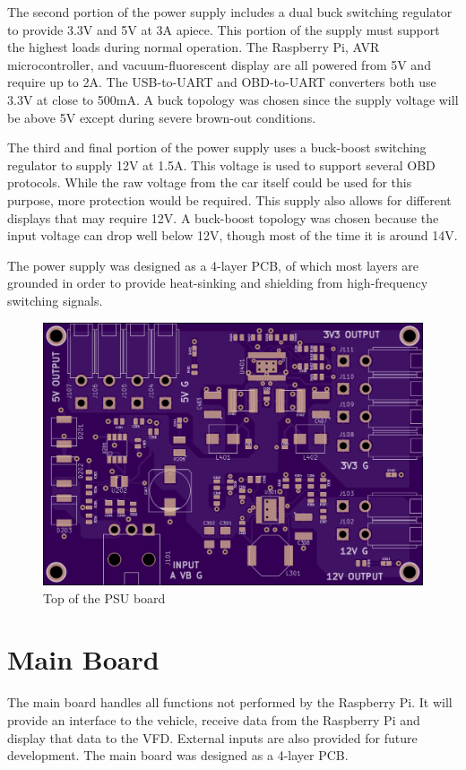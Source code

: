 The second portion of the power supply includes a dual buck switching regulator
to provide 3.3V and 5V at 3A apiece.  This portion of the supply must support 
the highest loads during normal operation.  The Raspberry Pi, AVR 
microcontroller, and vacuum-fluorescent display are all powered from 5V and 
require up to 2A.  The USB-to-UART \cite{ft2232hds} and OBD-to-UART \cite{stn1110ds} converters both use 3.3V at 
close to 500mA.  A buck topology was chosen since the supply voltage will be
above 5V except during severe brown-out conditions.

The third and final portion of the power supply uses a buck-boost switching
regulator \cite{ltc3115ds} to supply 12V at 1.5A.  This voltage is used to support several
OBD protocols.  While the raw voltage from the car itself could be used
for this purpose, more protection would be required.  This supply also allows
for different displays that may require 12V.  A buck-boost topology was chosen
because the input voltage can drop well below 12V, though most of the time it is
around 14V.

The power supply was designed as a 4-layer PCB, of which most layers are grounded 
in order to provide heat-sinking and shielding from high-frequency switching signals.

\begin{figure}[h]
\includegraphics[width=\textwidth]{img/psu_render_top.png}
\caption{Top of the PSU board}
\label{fig:psu render}
\end{figure}

\section{Main Board}
The main board handles all functions not performed by the Raspberry Pi.  It will
provide an interface to the vehicle, receive data from the Raspberry Pi and 
display that data to the VFD.  External inputs are also provided for future 
development.  The main board was designed as a 4-layer PCB.

